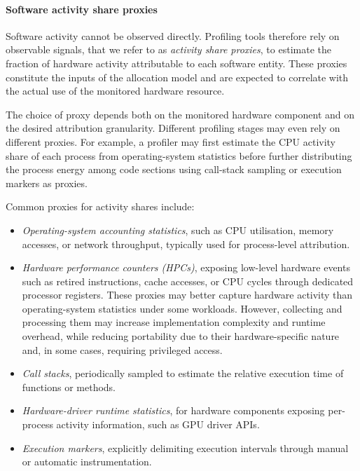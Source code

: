 \documentclass[
  acmsmall,
  screen,
  review,
  xcolor={dvipsnames,usenames}
]{acmart}
\begin{document}
\paragraph{\textbf{Software activity share proxies}}

Software activity cannot be observed directly. Profiling tools therefore rely on observable signals, that we refer to as \emph{activity share proxies}, to estimate the fraction of hardware activity attributable to each software entity. These proxies constitute the inputs of the allocation model and are expected to correlate with the actual use of the monitored hardware resource.

The choice of proxy depends both on the monitored hardware component and on the desired attribution granularity. Different profiling stages may even rely on different proxies. For example, a profiler may first estimate the CPU activity share of each process from operating-system statistics before further distributing the process energy among code sections using call-stack sampling or execution markers as proxies.

Common proxies for activity shares include:

\begin{itemize}
    \item \emph{Operating-system accounting statistics}, such as CPU utilisation, memory accesses, or network throughput, typically used for process-level attribution.

    \item \emph{Hardware performance counters (HPCs)}, exposing low-level hardware events such as retired instructions, cache accesses, or CPU cycles through dedicated processor registers. These proxies may better capture hardware activity than operating-system statistics under some workloads. However, collecting and processing them may increase implementation complexity and runtime overhead, while reducing portability due to their hardware-specific nature and, in some cases, requiring privileged access.

    \item \emph{Call stacks}, periodically sampled to estimate the relative execution time of functions or methods.

    \item \emph{Hardware-driver runtime statistics}, for hardware components exposing per-process activity information, such as GPU driver APIs.

    \item \emph{Execution markers}, explicitly delimiting execution intervals through manual or automatic instrumentation.
\end{itemize}
\end{document}
